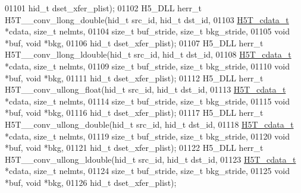 \begin{DoxyCode}
01101                                      hid\_t dset\_xfer\_plist);
01102 H5\_DLL herr\_t H5T\_\_conv\_llong\_double(hid\_t src\_id, hid\_t dst\_id,
01103                      \hyperlink{struct_h5_t__cdata__t}{H5T\_cdata\_t} *cdata, \textcolor{keywordtype}{size\_t} nelmts,
01104                      \textcolor{keywordtype}{size\_t} buf\_stride, \textcolor{keywordtype}{size\_t} bkg\_stride,
01105                                      \textcolor{keywordtype}{void} *buf, \textcolor{keywordtype}{void} *bkg,
01106                                      hid\_t dset\_xfer\_plist);
01107 H5\_DLL herr\_t H5T\_\_conv\_llong\_ldouble(hid\_t src\_id, hid\_t dst\_id,
01108                      \hyperlink{struct_h5_t__cdata__t}{H5T\_cdata\_t} *cdata, \textcolor{keywordtype}{size\_t} nelmts,
01109                      \textcolor{keywordtype}{size\_t} buf\_stride, \textcolor{keywordtype}{size\_t} bkg\_stride,
01110                                      \textcolor{keywordtype}{void} *buf, \textcolor{keywordtype}{void} *bkg,
01111                                      hid\_t dset\_xfer\_plist);
01112 H5\_DLL herr\_t H5T\_\_conv\_ullong\_float(hid\_t src\_id, hid\_t dst\_id,
01113                      \hyperlink{struct_h5_t__cdata__t}{H5T\_cdata\_t} *cdata, \textcolor{keywordtype}{size\_t} nelmts,
01114                      \textcolor{keywordtype}{size\_t} buf\_stride, \textcolor{keywordtype}{size\_t} bkg\_stride,
01115                                      \textcolor{keywordtype}{void} *buf, \textcolor{keywordtype}{void} *bkg,
01116                                      hid\_t dset\_xfer\_plist);
01117 H5\_DLL herr\_t H5T\_\_conv\_ullong\_double(hid\_t src\_id, hid\_t dst\_id,
01118                      \hyperlink{struct_h5_t__cdata__t}{H5T\_cdata\_t} *cdata, \textcolor{keywordtype}{size\_t} nelmts,
01119                      \textcolor{keywordtype}{size\_t} buf\_stride, \textcolor{keywordtype}{size\_t} bkg\_stride,
01120                                      \textcolor{keywordtype}{void} *buf, \textcolor{keywordtype}{void} *bkg,
01121                                      hid\_t dset\_xfer\_plist);
01122 H5\_DLL herr\_t H5T\_\_conv\_ullong\_ldouble(hid\_t src\_id, hid\_t dst\_id,
01123                      \hyperlink{struct_h5_t__cdata__t}{H5T\_cdata\_t} *cdata, \textcolor{keywordtype}{size\_t} nelmts,
01124                      \textcolor{keywordtype}{size\_t} buf\_stride, \textcolor{keywordtype}{size\_t} bkg\_stride,
01125                                      \textcolor{keywordtype}{void} *buf, \textcolor{keywordtype}{void} *bkg,
01126                                      hid\_t dset\_xfer\_plist);

\end{DoxyCode}
